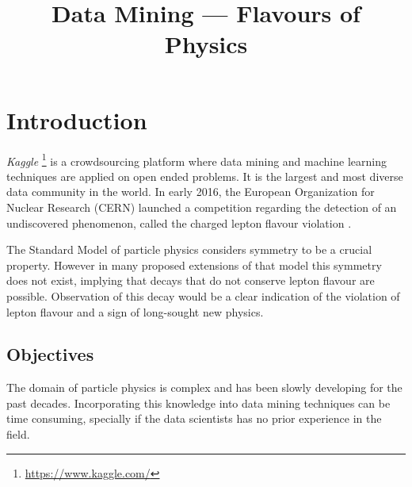 \documentclass[conference]{IEEEtran}
\begin{document}
\title{Data Mining --- Flavours of Physics}

\author{

}

\maketitle


\begin{abstract}
\end{abstract}


\IEEEpeerreviewmaketitle%


\section{Introduction}
\label{sec:intro}
\textit{Kaggle} \footnote{\url{https://www.kaggle.com/}} is a crowdsourcing platform where data mining and machine learning techniques are applied on open ended problems. It is the largest and most diverse data community in the world. In early 2016, the European Organization for Nuclear Research (CERN) launched a competition regarding the detection of an undiscovered phenomenon, called the charged lepton flavour violation \cite{hirsch2011charged}.

The Standard Model of particle physics considers symmetry to be a crucial property. However in many proposed extensions of that model this symmetry does not exist, implying that decays that do not conserve lepton flavour are possible. Observation of this decay would be a clear indication of the violation of lepton flavour and a sign of long-sought new physics.

\subsection{Objectives}
\label{sec:objectives}
The domain of particle physics is complex and has been slowly developing for the past decades. Incorporating this knowledge into data mining techniques can be time consuming, specially if the data scientists has no prior experience in the field.
\end{document}
